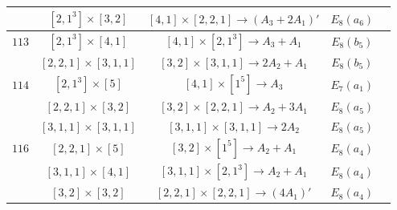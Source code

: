 \documentclass[reqno,12pt]{amsart}
\numberwithin{equation}{section}
\theoremstyle{plain}
\theoremstyle{definition}
\begin{document}
\begin{table}[htbp]
\begin{tabular}{|c|c|c|c|c|}
&  $ [2,1^3]\times [3,2] $  & $[4,1]\times [2,2,1]\rightarrow      (A_3+2A_1)' $  &   $E_8(a_6)$        \\
\hline

$ 113$    
&  $ [2,1^3]\times [4,1] $  & $[4,1]\times [2,1^3]\rightarrow      A_3+A_1 $  &   $E_8(b_5)$        \\
&  $ [2,2,1]\times [3,1,1] $  & $[3,2]\times [3,1,1]\rightarrow      2A_2+A_1 $  &   $E_8(b_5)$        \\
\hline

$ 114$    
&  $ [2,1^3]\times [5] $  & $[4,1]\times [1^5]\rightarrow      A_3 $  &   $E_7(a_1)$        \\
&  $ [2,2,1]\times [3,2] $  & $[3,2]\times [2,2,1]\rightarrow      A_2+3A_1 $  &   $E_8(a_5)$        \\
&  $ [3,1,1]\times [3,1,1] $  & $[3,1,1]\times [3,1,1]\rightarrow      2A_2$  &   $E_8(a_5)$        \\
\hline

$ 116$    
&  $ [2,2,1]\times [5] $  & $[3,2]\times [1^5]\rightarrow      A_2+A_1 $  &   $E_8(a_4)$        \\
&  $ [3,1,1]\times [4,1] $  & $[3,1,1]\times [2,1^3]\rightarrow      A_2+A_1 $  &   $E_8(a_4)$        \\
&  $ [3,2]\times [3,2] $  & $[2,2,1]\times [2,2,1]\rightarrow      (4A_1)'$  &   $E_8(a_4)$        \\
\hline
	\end{tabular}
	\bigskip
	
\end{table}

\hspace{15cm}

\newpage
\end{document}

